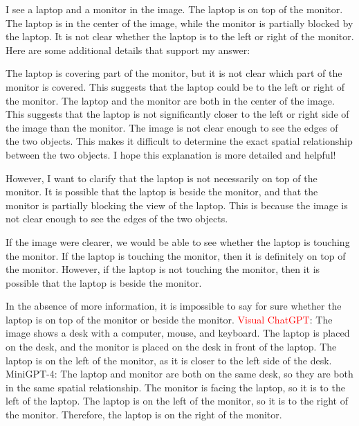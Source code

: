 \begin{enumerate}
    I see a laptop and a monitor in the image.
    The laptop is on top of the monitor.
    The laptop is in the center of the image, while the monitor is partially blocked by the laptop.
    It is not clear whether the laptop is to the left or right of the monitor.
    Here are some additional details that support my answer:
    
    The laptop is covering part of the monitor, but it is not clear which part of the monitor is covered. This suggests that the laptop could be to the left or right of the monitor.
    The laptop and the monitor are both in the center of the image. This suggests that the laptop is not significantly closer to the left or right side of the image than the monitor.
    The image is not clear enough to see the edges of the two objects. This makes it difficult to determine the exact spatial relationship between the two objects.
    I hope this explanation is more detailed and helpful!
    
    However, I want to clarify that the laptop is not necessarily on top of the monitor. It is possible that the laptop is beside the monitor, and that the monitor is partially blocking the view of the laptop. This is because the image is not clear enough to see the edges of the two objects.
    
    If the image were clearer, we would be able to see whether the laptop is touching the monitor. If the laptop is touching the monitor, then it is definitely on top of the monitor. However, if the laptop is not touching the monitor, then it is possible that the laptop is beside the monitor.
    
    In the absence of more information, it is impossible to say for sure whether the laptop is on top of the monitor or beside the monitor.
    \subitem \textcolor{red}{Visual ChatGPT}: The image shows a desk with a computer, mouse, and keyboard. The laptop is placed on the desk, and the monitor is placed on the desk in front of the laptop. The laptop is on the left of the monitor, as it is closer to the left side of the desk.
    \subitem MiniGPT-4: The laptop and monitor are both on the same desk, so they are both in the same spatial relationship. The monitor is facing the laptop, so it is to the left of the laptop. The laptop is on the left of the monitor, so it is to the right of the monitor. Therefore, the laptop is on the right of the monitor.
\end{enumerate}
